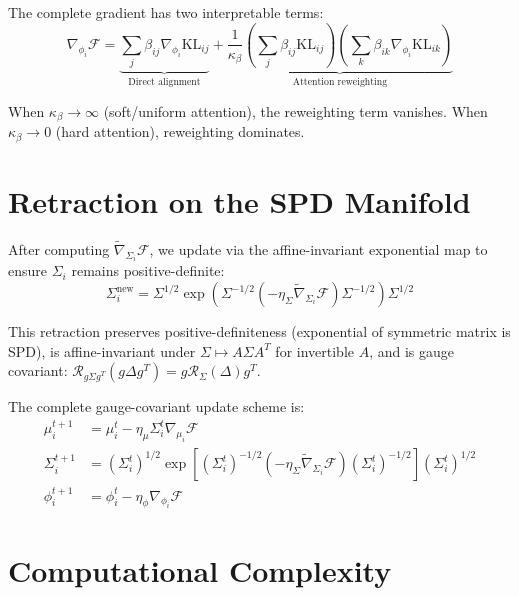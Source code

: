 \documentclass[11pt]{article}
\begin{document}
The complete gradient has two interpretable terms:
\begin{equation}
\boxed{\nabla_{\phi_i} \mathcal{F} = \underbrace{\sum_j \beta_{ij}\nabla_{\phi_i}\mathrm{KL}_{ij}}_{\text{Direct alignment}} + \underbrace{\frac{1}{\kappa_\beta}\left(\sum_j \beta_{ij}\mathrm{KL}_{ij}\right) \left(\sum_k \beta_{ik}\nabla_{\phi_i}\mathrm{KL}_{ik}\right)}_{\text{Attention reweighting}}}
\end{equation}

When $\kappa_\beta \to \infty$ (soft/uniform attention), the reweighting term vanishes. When $\kappa_\beta \to 0$ (hard attention), reweighting dominates.

\section{Retraction on the SPD Manifold}
\label{app:retraction}

After computing $\tilde{\nabla}_{\Sigma_i} \mathcal{F}$, we update via the affine-invariant exponential map to ensure $\Sigma_i$ remains positive-definite:
\begin{equation}
\Sigma_i^{\mathrm{new}} = \Sigma^{1/2} \exp\left(\Sigma^{-1/2} (-\eta_\Sigma \tilde{\nabla}_{\Sigma_i} \mathcal{F}) \Sigma^{-1/2}\right) \Sigma^{1/2}
\end{equation}

This retraction preserves positive-definiteness (exponential of symmetric matrix is SPD), is affine-invariant under $\Sigma \mapsto A\Sigma A^T$ for invertible $A$, and is gauge covariant: $\mathcal{R}_{g\Sigma g^T}(g\Delta g^T) = g \mathcal{R}_{\Sigma}(\Delta) g^T$.

The complete gauge-covariant update scheme is:
\begin{align}
\mu_i^{t+1} &= \mu_i^t - \eta_\mu \Sigma_i^t \nabla_{\mu_i} \mathcal{F} \\
\Sigma_i^{t+1} &= \left(\Sigma_i^t\right)^{1/2} \exp\left[\left(\Sigma_i^t\right)^{-1/2}\left(-\eta_\Sigma \tilde{\nabla}_{\Sigma_i} \mathcal{F}\right)\left(\Sigma_i^t\right)^{-1/2}\right] \left(\Sigma_i^t\right)^{1/2} \\
\phi_i^{t+1} &= \phi_i^t - \eta_\phi \nabla_{\phi_i} \mathcal{F}
\end{align}

\section{Computational Complexity}
\label{app:complexity}
\end{document}
